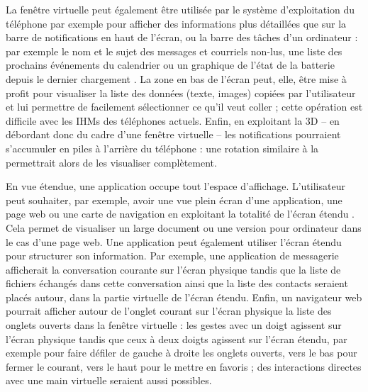 La fenêtre virtuelle peut également être utilisée par le système d'exploitation du téléphone par exemple pour afficher des informations plus détaillées que sur la barre de notifications en haut de l'écran, ou la barre des tâches d'un ordinateur : par exemple le nom et le sujet des messages et courriels non-lus, une liste des prochains événements du calendrier ou un graphique de l'état de la batterie depuis le dernier chargement . La zone en bas de l'écran peut, elle, être mise à profit pour visualiser la liste des données (texte, images) copiées par l'utilisateur et lui permettre de facilement sélectionner ce qu'il veut coller ; cette opération est difficile avec les IHMs des téléphones actuels. Enfin, en exploitant la 3D -- en débordant donc du cadre d'une fenêtre virtuelle -- les notifications pourraient s'accumuler en piles à l'arrière du téléphone : une rotation similaire à la  permettrait alors de les visualiser complètement.


En vue étendue, une application occupe tout l'espace d'affichage. L'utilisateur peut souhaiter, par exemple, avoir une vue plein écran d'une application, une page web ou une carte de navigation en exploitant la totalité de l'écran étendu . Cela permet de visualiser un large document ou une version pour ordinateur dans le cas d'une page web. Une application peut également utiliser l'écran étendu pour structurer son information. Par exemple, une application de messagerie afficherait la conversation courante sur l'écran physique tandis que la liste de fichiers échangés dans cette conversation ainsi que la liste des contacts seraient placés autour, dans la partie virtuelle de l'écran étendu. Enfin, un navigateur web pourrait afficher autour de l'onglet courant sur l'écran physique la liste des onglets ouverts dans la fenêtre virtuelle : les gestes avec un doigt agissent sur l'écran physique tandis que ceux à deux doigts agissent sur l'écran étendu, par exemple pour faire défiler de gauche à droite les onglets ouverts, vers le bas pour fermer le courant, vers le haut pour le mettre en favoris ; des interactions directes avec une main virtuelle seraient aussi possibles.

